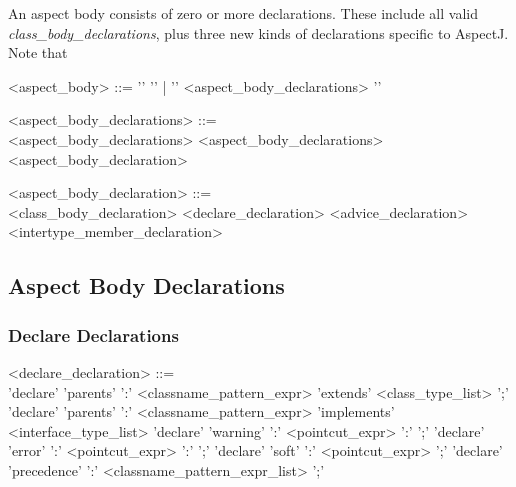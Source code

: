An aspect body consists of zero or more declarations.   These include
all valid {\em class\_body\_declarations},  plus three new kinds of
declarations specific to AspectJ.   Note that 

\begin{minipage}{6in}
\begin{blue}
\begin{grammar}
<aspect_body> ::= '{' '}' | '{' <aspect_body_declarations> '}'

<aspect_body_declarations> ::= \hspace{1in} \\
                  <aspect_body_declarations> 
          \alt    <aspect_body_declarations> <aspect_body_declaration>

<aspect_body_declaration> ::= \hspace{1in} \\
                  {\red <class_body_declaration>}
          \alt    <declare_declaration>
          \alt    <advice_declaration>
          \alt    <intertype_member_declaration>
\end{grammar}
\end{blue}
\end{minipage}

\subsection{Aspect Body Declarations}

\subsubsection{Declare Declarations}

\begin{minipage}{6in}
\begin{blue}
\begin{grammar}
<declare_declaration> ::= \hspace{1in} \\
       'declare' 'parents' ':' {\blue <classname_pattern_expr>} 'extends' 
           {\red <class_type_list>} ';' 
\alt   'declare' 'parents' ':' {\blue <classname_pattern_expr>} 'implements'
           {\red <interface_type_list>}
\alt   'declare' 'warning' ':' {\blue <pointcut_expr>} ':'
                                            {} ';'
\alt   'declare' 'error' ':' {\blue <pointcut_expr>} ':' 
                                            {} ';'
\alt   'declare' 'soft' ':' {\blue <pointcut_expr>} ';'
\alt   'declare' 'precedence' ':' {\blue <classname_pattern_expr_list>} ';'
\end{grammar}
\end{blue}
\end{minipage}

